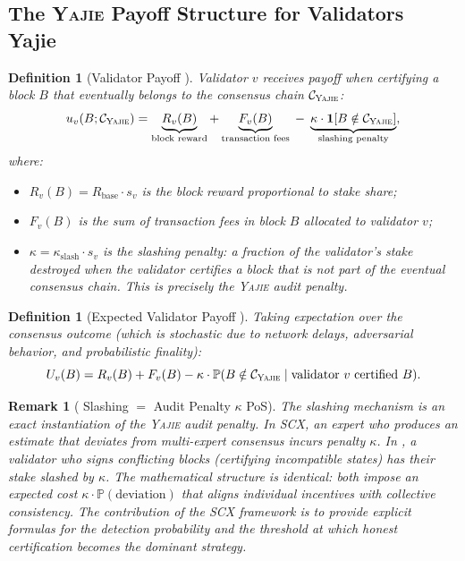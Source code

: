\documentclass[11pt,a4paper]{article}
\newtheorem{definition}[theorem]{Definition}
\newtheorem{remark}[theorem]{Remark}
\theoremstyle{definition}
\newcommand{\Yajie}{\textsc{Yajie}}
\newcommand{\SCX}{\textsc{SCX}}
\newcommand{\Pbb}{\mathbb{P}}
\newcommand{\ind}[1]{\mathbf{1}[#1]}
\newcommand{\PoS}{\mathrm{PoS}}
\begin{document}
\subsection{The \Yajie{} Payoff Structure for Validators Yajie}
\begin{definition}[Validator Payoff ]
\label{def:validator_payoff}
Validator $v$ receives payoff when certifying a block $B$ that eventually belongs to the consensus chain $\mathcal{C}_{\Yajie}$:
\begin{equation}
    u_v(B; \mathcal{C}_{\Yajie}) = \underbrace{R_v(B)}_{\text{block reward}} + \underbrace{F_v(B)}_{\text{transaction fees}} \;-\; \underbrace{\kappa \cdot \ind{B \notin \mathcal{C}_{\Yajie}}}_{\text{slashing penalty}},
    \label{eq:validator_payoff}
\end{equation}
where:
\begin{itemize}
    \item $R_v(B) = R_{\mathrm{base}} \cdot s_v$ is the block reward proportional to stake share;
    \item $F_v(B)$ is the sum of transaction fees in block $B$ allocated to validator $v$;
    \item $\kappa = \kappa_{\mathrm{slash}} \cdot s_v$ is the slashing penalty: a fraction of the validator's stake destroyed when the validator certifies a block that is not part of the eventual consensus chain. This is precisely the \Yajie{} audit penalty.
\end{itemize}
\end{definition}
\begin{definition}[Expected Validator Payoff ]
\label{def:expected_validator_payoff}
Taking expectation over the consensus outcome (which is stochastic due to network delays, adversarial behavior, and probabilistic finality):
\begin{equation}
    U_v(B) = R_v(B) + F_v(B) - \kappa \cdot \Pbb(B \notin \mathcal{C}_{\Yajie} \mid \text{validator $v$ certified $B$}).
    \label{eq:expected_validator_payoff}
\end{equation}
\end{definition}
\begin{remark}[\PoS{} Slashing $=$ Audit Penalty $\kappa$ PoS]
\label{rem:slashing_equals_kappa}
The \PoS{} slashing mechanism is an exact instantiation of the \Yajie{} audit penalty. In \SCX{}, an expert who produces an estimate that deviates from multi-expert consensus incurs penalty $\kappa$. In \PoS{}, a validator who signs conflicting blocks (certifying incompatible states) has their stake slashed by $\kappa$. The mathematical structure is identical: both impose an expected cost $\kappa \cdot \Pbb(\text{deviation})$ that aligns individual incentives with collective consistency. The contribution of the \SCX{} framework is to provide explicit formulas for the detection probability and the threshold at which honest certification becomes the dominant strategy.
\end{remark}
\end{document}
